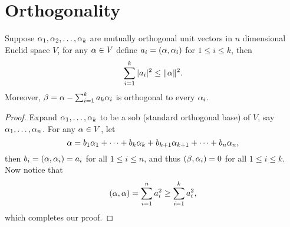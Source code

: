\section{Orthogonality}
\begin{pro}%
	Suppose $\alpha_1,\alpha_2,\dots,\alpha_k$ are mutually orthogonal unit vectors in $n$ dimensional Euclid space $V$, for any $\alpha\in V$ define $a_i=(\alpha,\alpha_i)$ for $1\leq i\leq k$, then
	\[\sum_{i=1}^k |a_i|^2\leq \|\alpha\|^2.\]
	Moreover, $\beta=\alpha-\sum_{i=1}^k a_k\alpha_i$ is orthogonal to every $\alpha_i$.
\end{pro}
\begin{proof}
	Expand $\alpha_1,\dots,\alpha_k$ to be a sob (standard orthogonal base) of $V$, say $\alpha_1,\dots,\alpha_n$. For any $\alpha\in V$, let
	\[\alpha=b_1\alpha_1+\dots+b_k\alpha_k+b_{k+1}\alpha_{k+1}+\dots+b_n\alpha_n,\]
	then $b_i=(\alpha,\alpha_i)=a_i$ for all $1\leq i\leq n$, and thus $(\beta,\alpha_i)=0$ for all $1\leq i\leq k$. Now notice that
	\[(\alpha,\alpha)=\sum_{i=1}^n a_i^2\geq \sum_{i=1}^k a_i^2,\]
	which completes our proof.
\end{proof}

